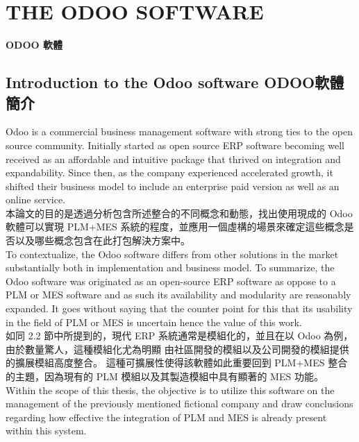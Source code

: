 \chapter{THE ODOO SOFTWARE} 
\setcounter{page}{32}  %
\begin{center}
\fontsize{18}{16}\selectfont \textbf{ODOO 軟體}\\
\end{center}


\section{Introduction to the Odoo software ODOO軟體簡介}
\fontsize{12}{2.5pt}\sectionef  
{Odoo is a commercial business management software with strong ties to the open source community. Initially started as open source ERP software becoming well received as an affordable and intuitive package that thrived on integration and expandability. Since then, as the company experienced accelerated growth, it shifted their business model to include an enterprise paid version as well as an online service.}\\[1pt]

\fontsize{12}{2.5pt}\sectionef 
{本論文的目的是透過分析包含所述整合的不同概念和動態，找出使用現成的 Odoo 軟體可以實現 PLM+MES 系統的程度，並應用一個虛構的場景來確定這些概念是否以及哪些概念包含在此打包解決方案中。}\\[15pt]

\fontsize{12}{2.5pt}\sectionef
{To contextualize, the Odoo software differs from other solutions in the market substantially both in implementation and business model. To summarize, the Odoo software 
was originated as an open-source ERP software as oppose to a PLM or MES software and as such its availability and modularity are reasonably expanded. It goes without saying that the counter point for this that its usability in the field of PLM or MES is uncertain hence the value of this work.}\\[1pt]

\fontsize{12}{2.5pt}\sectionef  
{如同 2.2 節中所提到的，現代 ERP 系統通常是模組化的，並且在以 Odoo 為例，由於數量驚人，這種模組化尤為明顯
由社區開發的模組以及公司開發的模組提供的擴展模組高度整合。 這種可擴展性使得該軟體如此重要回到 PLM+MES 整合的主題，因為現有的 PLM 模組以及其製造模組中具有顯著的 MES 功能。}\\[15pt]

\fontsize{12}{2.5pt}\sectionef  
{Within the scope of this thesis, the objective is to utilize this software on the management of the previously mentioned fictional company and draw conclusions regarding how effective the integration of PLM and MES is already present within this system.  }\\[1pt]

